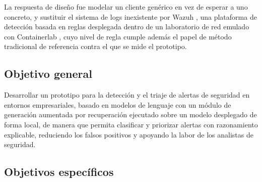 La respuesta de diseño fue modelar un cliente genérico en vez de esperar a uno concreto, y sustituir
el sistema de logs inexistente por Wazuh \cite{wazuhdocs}, una plataforma de detección basada en reglas desplegada
dentro de un laboratorio de red emulado con Containerlab \cite{containerlabdocs}, cuyo nivel de
regla cumple además el papel de método tradicional de referencia contra el que se mide el
prototipo.

\subsection*{Objetivo general}

Desarrollar un prototipo para la detección y el triaje de alertas de seguridad en entornos
empresariales, basado en modelos de lenguaje con un módulo de generación aumentada por
recuperación ejecutado sobre un modelo desplegado de forma local, de manera que permita clasificar
y priorizar alertas con razonamiento explicable, reduciendo los falsos positivos y apoyando la
labor de los analistas de seguridad.

\subsection*{Objetivos específicos}

